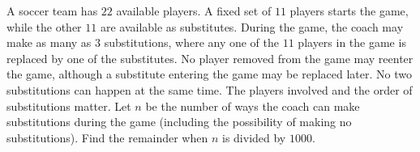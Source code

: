 A soccer team has $22$ available players. A fixed set of $11$ players starts the game, while the other $11$ are available as substitutes. During the game, the coach may make as many as $3$ substitutions, where any one of the $11$ players in the game is replaced by one of the substitutes. No player removed from the game may reenter the game, although a substitute entering the game may be replaced later. No two substitutions can happen at the same time. The players involved and the order of substitutions matter. Let $n$ be the number of ways the coach can make substitutions during the game (including the possibility of making no substitutions). Find the remainder when $n$ is divided by $1000$.